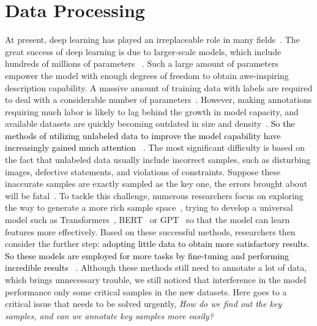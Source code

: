 \documentclass{article}
\newcommand{\p}[1]{\textcolor{black}{#1}}
\begin{document}
\section{Data Processing}
\label{sec:DP}
At present, deep learning has played an irreplaceable role in many fields~\cite{dong2021survey, khan2021deep}.
The great success of deep learning is due to larger-scale models, which include hundreds of millions of parameters ~\cite{brutzkus2019larger}.
Such a large amount of parameters empower the model with enough degrees of freedom to obtain awe-inspiring description capability. A massive amount of training data with labels are required to deal with a considerable number of parameters~\cite{zhou2014learning}.
However, making annotations requiring much labor is likely to lag behind the growth in model capacity, and available datasets are quickly becoming outdated in size and density~\cite{yu2015lsun}.
\p{So the methods of utilizing unlabeled data to improve the model capability have increasingly gained much attention} ~\cite{zhou2014learning,simeoni2021rethinking,wang2021trust,shi2021boosting}.
The most significant difficulty is based on the fact that unlabeled data usually include incorrect samples, such as disturbing images, defective statements, and violations of constraints. Suppose these inaccurate samples are exactly sampled as the key one, the errors brought about will be fatal~\cite{ren2020not}.
To tackle this challenge, numerous researchers focus on exploring the way to generate a more rich sample space~\cite{li2020layoutgan,niu2020defect,zhao2020differentiable}, trying to develop a universal model such as Transformers~\cite{khan2021transformers}, BERT~\cite{devlin2018bert} or GPT~\cite{radford2018improving} so that the model can learn features more effectively.
Based on these successful methods, researchers then consider the further step: \p{adopting little data to obtain more satisfactory results. So these models are employed for more tasks by fine-tuning and performing incredible results} ~\cite{pham2021classification,chen2020recall,wang2018interactive}.
Although these methods still need to annotate a lot of data, which brings unnecessary trouble, we still noticed that interference in the model performance only some critical samples in the new datasets.
Here goes to a critical issue that needs to be solved urgently,
\emph{How do we find out the key samples, and can we annotate key samples more easily?}
\end{document}
